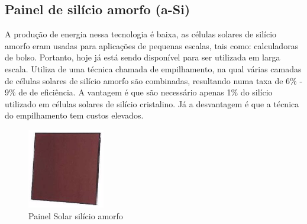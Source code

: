 \subsection{Painel de silício amorfo (a-Si)}

A produção de energia nessa tecnologia é baixa, as células solares de silício amorfo eram usadas para aplicações de pequenas escalas, tais como: calculadoras de bolso. Portanto, hoje já está sendo disponível para ser utilizada em larga escala.  Utiliza de uma técnica chamada de empilhamento, na qual várias camadas de células solares de silício amorfo são combinadas, resultando numa taxa de 6\% - 9\% de de eficiência. A vantagem é que são necessário apenas 1\% do silício utilizado em células solares de silício cristalino. Já a desvantagem é que a técnica do empilhamento tem custos elevados.

\begin{figure}[!h]
\centering
\includegraphics[width=0.3\textwidth]{figuras/marrom.png}
\caption{Painel Solar silício amorfo}
\label{fig:marrom}
\end{figure}